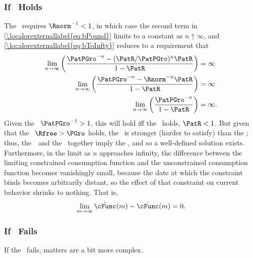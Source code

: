 \documentclass[\econtexRoot/BufferStockTheory.tex]{subfiles}
\begin{document}
\subsubsection{If \FHWC~Holds}
The \FHWC~requires $\Rnorm^{-1} < 1$, in which case the second term in \eqref{\localorexternallabel{eq:bPound}} limits to a constant as $n \uparrow \infty$, and \eqref{\localorexternallabel{eq:bToInfty}} reduces to a requirement that
\begin{eqnarray*}
  \lim_{n \rightarrow \infty} \left(\frac{\PatPGro^{-n}-(\PatR/\PatPGro)^{n}\PatR}{1-\PatR}\right)  & = \infty
\\  \lim_{n \rightarrow \infty} \left(\frac{\PatPGro^{-n}-\Rnorm^{-n}\PatR}{1-\PatR}\right)  & = \infty
\\  \lim_{n \rightarrow \infty} \left(\frac{\PatPGro^{-n}}{1-\PatR}\right)  & = \infty.
\end{eqnarray*}
Given the \PFGIC~$\PatPGro^{-1}>1$, this will hold iff the \RIC~holds, $\PatR < 1$.  But given that the \FHWC~$\Rfree > \PGro$ holds, the \PFGIC~is stronger (harder to satisfy) than the \RIC; thus, the~\FHWC~and the \PFGIC~together imply the \RIC, and so a well-defined
solution exists.  Furthermore, in the limit as $n$ approaches
infinity, the difference between the limiting constrained consumption
function and the unconstrained consumption function becomes
vanishingly small, because the date at which the constraint binds
becomes arbitrarily distant, so the effect of that constraint on current
behavior shrinks to nothing.  That is,
\begin{align}
\lim_{m \rightarrow \infty}\grave{\cFunc}(m) - \bar{\cFunc}(m) = 0.
\end{align}


\subsubsection{If \FHWC~Fails}
If the \FHWC~fails, matters are a bit more complex.

\begin{comment}
As noted in the main text, the Finite Value Requirement for such a consumer
requires $\PatPGro < (\Rfree/\PGro)^{1/\CRRA}$,\footnote{A
  unique well-defined nondegenerate limiting consumption function can
  actually exist even if a nondegenerate value function does not.  But
  the parametric combinations required for this are somewhat peculiar
  (including both $\Rfree < 1$ and $\PGro < 1$); but we restrict our attention
  to the more useful and plausible cases with finite value.} which is stronger (holds
in strictly fewer circumstances) than the \PFGIC~condition $\PatPGro < 1$.
Thus, the \PFGIC~is an implication of $\cncl{\FHWC}$.
\end{comment}
\end{document}
